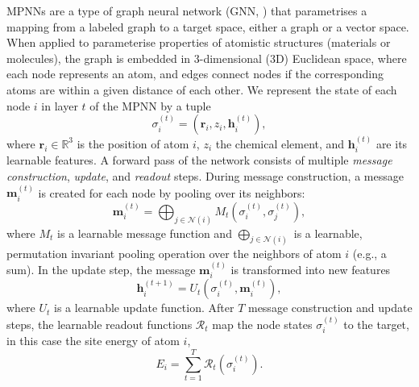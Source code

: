 \documentclass{article}
\begin{document}
MPNNs \cite{Gilmer2017MPNN, GeometricDL2021Petar} are a type of graph neural network (GNN, \cite{Scarselli_GNNs,Battaglia_GNNs,Welling_GNNs,GNN_review}) that parametrises a mapping from a labeled graph to a target space, either a graph or a vector space.
When applied to parameterise properties of atomistic structures (materials or molecules),
the graph is embedded in 3-dimensional (3D) Euclidean space, where each node represents an atom, and edges connect nodes if the corresponding atoms are within a given distance of each other.
We represent the state of each node $i$ in layer $t$ of the MPNN by a tuple
%
\begin{equation}
  \sigma_{i}^{(t)} = (\boldsymbol{r}_{i}, z_{i}, \boldsymbol{h}_{i}^{(t)}),
\end{equation}
%
where $\boldsymbol{r}_{i} \in \mathbb{R}^3$ is the position of atom $i$,
$z_{i}$ the chemical element,
and $\boldsymbol{h}_{i}^{(t)}$ are its learnable features.
%
A forward pass of the network consists of multiple \textit{message construction}, \emph{update}, and \emph{readout} steps.
During message construction, a message $\boldsymbol{m}_i^{(t)}$ is created for each node by pooling over its neighbors:
%
\begin{equation}
  \label{eqn:message_func}
  \boldsymbol{m}_i^{(t)} = \bigoplus_{j \in \mathcal{N}(i)} M_t(\sigma_i^{(t)}, \sigma_j^{(t)}),
\end{equation}
%
where $M_t$ is a learnable message function and
$\bigoplus_{j \in \mathcal{N}(i)}$ is a learnable, permutation invariant pooling operation over the neighbors of atom $i$ (e.g., a sum).
In the update step, the message $\boldsymbol{m}_i^{(t)}$ is transformed into new features
%
\begin{equation}
  \label{eqn:update_function}
  \boldsymbol{h}_i^{(t+1)} = U_t(\sigma_i^{(t)}, \boldsymbol{m}_i^{(t)}),
\end{equation}
where $U_t$ is a learnable update function.
After $T$ message construction and update steps, the learnable readout functions $\mathcal{R}_t$ map the node states $\sigma_i^{(t)}$ to the target, in this case the site energy of atom $i$,
%
\begin{equation}
  \label{eq:readout_general}
  E_i = \sum_{t=1}^{T} \mathcal{R}_t(\sigma^{(t)}_i).
\end{equation}
%
\end{document}
